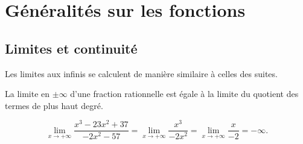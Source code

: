 
\TCDLessonStyleOn
\newcommand{\Df}{\mathcal{D}_f}

\chapter{G\'en\'eralit\'es sur les fonctions}
\section{Limites et continuit\'e}
      \begin{prop}
            Les limites aux infinis se calculent de mani\`ere similaire \`a celles des suites.
            
            La limite en $\pm\infty$ d'une fraction rationnelle est \'egale \`a la limite du quotient des termes de plus haut degr\'e.
            \begin{ex}
                  \[
                  \lim_{x\rightarrow+\infty} \frac{x^3-23x^2+37}{-2x^2-57} = \lim_{x\rightarrow+\infty} \frac{x^3}{-2x^2} 
                                                                           = \lim_{x\rightarrow+\infty} \frac{x}{-2}      
                                                                           = -\infty	.
                  \]
            \end{ex}
      \end{prop}
%
